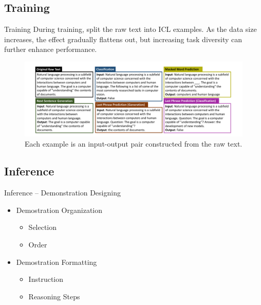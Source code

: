 \documentclass[aspectratio=1610,xcolor={dvipsnames},hyperref={colorlinks,unicode,linkcolor=violet,anchorcolor=BlueViolet,citecolor=YellowOrange,filecolor=black,urlcolor=Aquamarine}]{beamer}
\begin{document}
\subsection{Training}
\label{sec:orgb2ada29}

\begin{frame}[label={sec:orga32f7bd}]{Training}
During training, split the raw text into ICL examples.  As the data size increases, the effect gradually flattens out, but increasing task diversity can further enhance performance.

\begin{figure}[htbp]
\centering
\includegraphics[width=.9\linewidth]{./p2.png}
\caption{\label{fig:orgb827582}Each example is an input-output pair constructed from the raw text. }
\end{figure}
\end{frame}

\subsection{Inference}
\label{sec:org26a4982}

\begin{frame}[label={sec:org1417a51}]{Inference -- Demonstration Designing}
\begin{itemize}
\item Demostration Organization
\begin{itemize}
\item Selection
\item Order
\end{itemize}
\item Demostration Formatting
\begin{itemize}
\item Instruction
\item Reasoning Steps
\end{itemize}
\end{itemize}
\end{frame}
\end{document}
